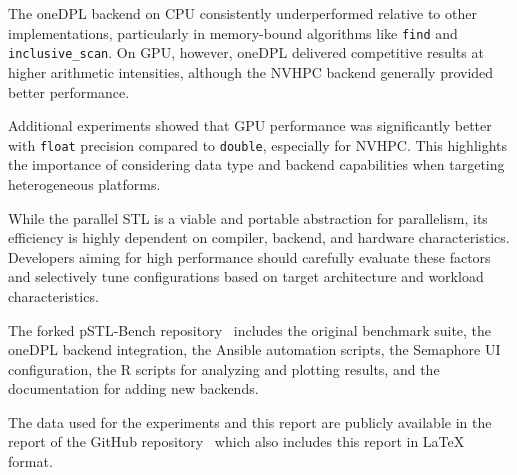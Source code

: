 \documentclass[sigconf]{acmart}
\begin{document}
The oneDPL backend on CPU consistently underperformed relative to other
implementations, particularly in memory-bound algorithms like \texttt{find} and
\texttt{inclusive\_scan}. On GPU, however, oneDPL delivered competitive results
at higher arithmetic intensities, although the NVHPC backend generally provided
better performance.

Additional experiments showed that GPU performance was significantly better
with \texttt{float} precision compared to \texttt{double}, especially for
NVHPC. This highlights the importance of considering data type and backend
capabilities when targeting heterogeneous platforms.

While the parallel STL is a viable and portable abstraction for parallelism,
its efficiency is highly dependent on compiler, backend, and hardware
characteristics. Developers aiming for high performance should carefully
evaluate these factors and selectively tune configurations based on target
architecture and workload characteristics.

The forked pSTL-Bench repository~\cite{pSTL-Bench_fork:github} includes the
original benchmark suite, the oneDPL backend integration, the Ansible
automation scripts, the Semaphore UI configuration, the R scripts for analyzing
and plotting results, and the documentation for adding new backends.

The data used for the experiments and this report are publicly available in the
report of the GitHub repository~\cite{pSTL-Bench-report:github} which also
includes this report in LaTeX format.
\end{document}
